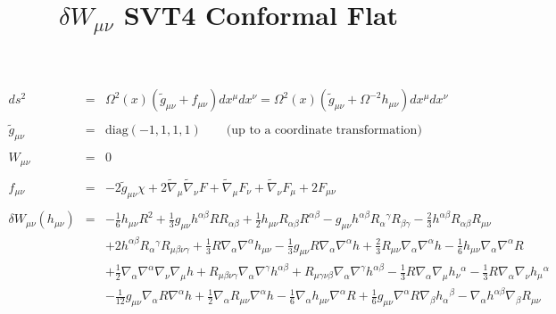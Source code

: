 \documentclass[10pt,letterpaper]{article}
\title{$\delta  W_{\mu\nu}$ SVT4 Conformal Flat}
\date{}
\numberwithin{equation}{section}
\begin{document}
 
\maketitle
\noindent 

\begin{eqnarray}
ds^2 &=& \Omega^2(x)(\tilde g_{\mu\nu} + f_{\mu\nu})dx^\mu dx^\nu = \Omega^2(x)\left( \tilde g_{\mu\nu} + \Omega^{-2}h_{\mu\nu}\right)dx^\mu dx^\nu
\label{geom2}
\\ \nonumber\\
\tilde g_{\mu\nu} &=& \text{diag}\left(-1,1,1,1\right)\qquad \text{(up to a coordinate transformation)}
\\ \nonumber\\
W_{\mu\nu} &=& 0
\\ \nonumber\\
f_{\mu\nu} &=& -2\tilde g_{\mu\nu} \chi + 2\tilde\nabla_\mu\tilde\nabla_\nu F + \tilde\nabla_\mu F_\nu + \tilde\nabla_\nu F_{\mu}+2F_{\mu\nu}
\\ \nonumber\\
\delta W_{\mu\nu}(h_{\mu\nu})&=& - \tfrac{1}{6} h_{\mu \nu } R^2 + \tfrac{1}{3} g_{\mu \nu } h^{\alpha \beta } R R_{\alpha \beta } + \tfrac{1}{2} h_{\mu \nu } R_{\alpha \beta } R^{\alpha \beta } -  g_{\mu \nu } h^{\alpha \beta } R_{\alpha }{}^{\gamma } R_{\beta \gamma } -  \tfrac{2}{3} h^{\alpha \beta } R_{\alpha \beta } R_{\mu \nu } \nonumber \\ 
&& + 2 h^{\alpha \beta } R_{\alpha }{}^{\gamma } R_{\mu \beta \nu \gamma } + \tfrac{1}{3} R \nabla_{\alpha }\nabla^{\alpha }h_{\mu \nu } -  \tfrac{1}{3} g_{\mu \nu } R \nabla_{\alpha }\nabla^{\alpha }h + \tfrac{2}{3} R_{\mu \nu } \nabla_{\alpha }\nabla^{\alpha }h -  \tfrac{1}{6} h_{\mu \nu } \nabla_{\alpha }\nabla^{\alpha }R \nonumber \\ 
&& + \tfrac{1}{2} \nabla_{\alpha }\nabla^{\alpha }\nabla_{\nu }\nabla_{\mu }h + R_{\mu \beta \nu \gamma } \nabla_{\alpha }\nabla^{\gamma }h^{\alpha \beta } + R_{\mu \gamma \nu \beta } \nabla_{\alpha }\nabla^{\gamma }h^{\alpha \beta } -  \tfrac{1}{3} R \nabla_{\alpha }\nabla_{\mu }h_{\nu }{}^{\alpha } -  \tfrac{1}{3} R \nabla_{\alpha }\nabla_{\nu }h_{\mu }{}^{\alpha } \nonumber \\ 
&& -  \tfrac{1}{12} g_{\mu \nu } \nabla_{\alpha }R \nabla^{\alpha }h + \tfrac{1}{2} \nabla_{\alpha }R_{\mu \nu } \nabla^{\alpha }h -  \tfrac{1}{6} \nabla_{\alpha }h_{\mu \nu } \nabla^{\alpha }R + \tfrac{1}{6} g_{\mu \nu } \nabla^{\alpha }R \nabla_{\beta }h_{\alpha }{}^{\beta } -  \nabla_{\alpha }h^{\alpha \beta } \nabla_{\beta }R_{\mu \nu } \nonumber \\ 

\end{eqnarray}
\end{document}
